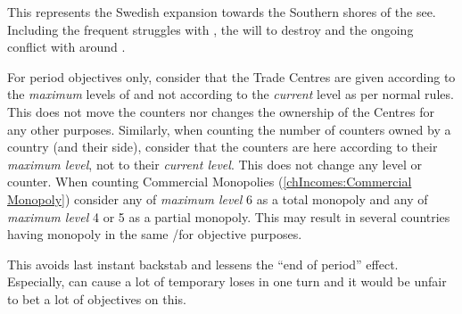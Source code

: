 \begin{histoire}
  This represents the Swedish expansion towards the Southern shores of
  the see. Including the frequent struggles with \POL, the will to
  destroy \paysHanse and the ongoing conflict with \RUS around
  \provinceIngria.
\end{histoire}

For period objectives only, consider that the Trade Centres are given
according to the \emph{maximum} levels of \TradeFLEET and not according
to the \emph{current} level as per normal rules.
\bparag This does not move the counters nor changes the ownership of the
Centres for any other purposes.
\bparag Similarly, when counting the number of \TradeFLEET counters
owned by a country (and their side), consider that the counters are here
according to their \emph{maximum level}, not to their \emph{current
  level}. This does not change any \TradeFLEET level or counter.
\bparag When counting Commercial Monopolies (\ref{chIncomes:Commercial
  Monopoly}) consider any \TradeFLEET of \emph{maximum level} 6 as a
total monopoly and any \TradeFLEET of \emph{maximum level} 4 or 5 as a
partial monopoly. This may result in several countries having monopoly
in the same \CTZ/\STZ for objective purposes.

\begin{designnote}
  This avoids last instant backstab and lessens the ``end of period''
  effect. Especially, \corsaire can cause a lot of temporary loses in
  one turn and it would be unfair to bet a lot of objectives \VPs on
  this. 
\end{designnote}

